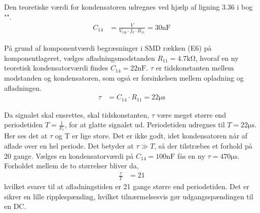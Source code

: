 Den teoretiske værdi for kondensatoren udregnes ved hjælp af ligning 3.36 i bog "\cite[side. 160]{Sedra19uu}".
\begin{align}
	C_{14} & = \frac{V}{V_{rip} \cdot f_0 \cdot R_{11}} = 30\si{\nano\farad}
\end{align}


På grund af komponentværdi begræsninger i SMD rækken (E6) på komponentlageret, vælges afladningsmodstanden $R_{11} = 4.7 \si{\kilo\ohm}$, hvoraf en ny teoretisk kondensatorværdi findes $C_{14} = 22 \si{\nano\farad}$.
$\tau$ er tidskonstanten mellem modstanden og kondensatoren, som også er forsinkelsen mellem opladning og afladningen. 
\begin{align}
	\tau & = C_{14} \cdot R_{11} = 22\si{\micro\second}
\end{align}

Da signalet skal ensrettes, skal tidskonstanten, $\tau$ være meget større end periodetiden $T = \frac{1}{F_c}$, for at glatte signalet ud. Periodetiden udregnes til $T = 22 \si{\micro\second}$. Her ses det at $\tau$ og T er lige store. Det er ikke godt, idet kondensatoren når af aflade over en hel periode. Det betyder at $\tau \gg T$, så der tilstræbes et forhold på 20 gange.
Vælges en kondensatorværdi på $C_{14} = 100 \si{\nano\farad}$ fås en ny $\tau = 470\si{\micro\second}$. Forholdet mellem de to størrelser bliver da, 
\begin{align}
	\frac{\tau}{T} & = 21
\end{align}
hvilket svarer til at afladningstiden er 21 gange større end periodetiden. Det er sikrer en lille ripplespænding, hvilket tilnærmelsesvis gør udgangsspændingen til en DC.